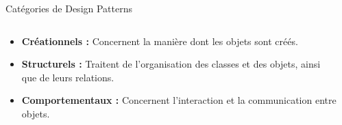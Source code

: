 \documentclass[aspectratio=169]{beamer}
\begin{document}
\begin{frame}{Catégories de Design Patterns}
    \begin{columns}
        \begin{column}{0.5\textwidth}
            \begin{itemize}
                \item<2-> \textbf{Créationnels :} Concernent la manière dont les objets sont créés.
                \item<3-> \textbf{Structurels :} Traitent de l'organisation des classes et des objets, ainsi que de leurs relations.
                \item<4-> \textbf{Comportementaux :} Concernent l'interaction et la communication entre objets.
            \end{itemize}
        \end{column}
        \begin{column}{0.5\textwidth}
\end{column}
\end{columns}
\end{frame}
\end{document}
